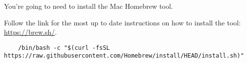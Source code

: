 You're going to need to install the Mac Homebrew tool. 

Follow the link for the most up to date instructions on how to install the tool: \href{https://brew.sh/}{https://brew.sh/}.

\begin{verbatim}
    /bin/bash -c "$(curl -fsSL https://raw.githubusercontent.com/Homebrew/install/HEAD/install.sh)"
\end{verbatim}
    

